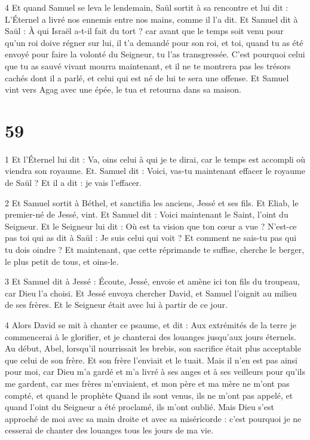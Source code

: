 \par 4 Et quand Samuel se leva le lendemain, Saül sortit à sa rencontre et lui dit : L'Éternel a livré nos ennemis entre nos mains, comme il l'a dit. Et Samuel dit à Saül : À qui Israël a-t-il fait du tort ? car avant que le temps soit venu pour qu'un roi doive régner sur lui, il t'a demandé pour son roi, et toi, quand tu as été envoyé pour faire la volonté du Seigneur, tu l'as transgressée. C'est pourquoi celui que tu as sauvé vivant mourra maintenant, et il ne te montrera pas les trésors cachés dont il a parlé, et celui qui est né de lui te sera une offense. Et Samuel vint vers Agag avec une épée, le tua et retourna dans sa maison.

\chapter{59}

\par 1 Et l'Éternel lui dit : Va, oins celui à qui je te dirai, car le temps est accompli où viendra son royaume. Et. Samuel dit : Voici, vas-tu maintenant effacer le royaume de Saül ? Et il a dit : je vais l’effacer.

\par 2 Et Samuel sortit à Béthel, et sanctifia les anciens, Jessé et ses fils. Et Eliab, le premier-né de Jessé, vint. Et Samuel dit : Voici maintenant le Saint, l'oint du Seigneur. Et le Seigneur lui dit : Où est ta vision que ton cœur a vue ? N'est-ce pas toi qui as dit à Saül : Je suis celui qui voit ? Et comment ne sais-tu pas qui tu dois oindre ? Et maintenant, que cette réprimande te suffise, cherche le berger, le plus petit de tous, et oins-le.

\par 3 Et Samuel dit à Jessé : Écoute, Jessé, envoie et amène ici ton fils du troupeau, car Dieu l'a choisi. Et Jessé envoya chercher David, et Samuel l'oignit au milieu de ses frères. Et le Seigneur était avec lui à partir de ce jour.

\par 4 Alors David se mit à chanter ce psaume, et dit : Aux extrémités de la terre je commencerai à le glorifier, et je chanterai des louanges jusqu'aux jours éternels. Au début, Abel, lorsqu'il nourrissait les brebis, son sacrifice était plus acceptable que celui de son frère. Et son frère l'enviait et le tuait. Mais il n'en est pas ainsi pour moi, car Dieu m'a gardé et m'a livré à ses anges et à ses veilleurs pour qu'ils me gardent, car mes frères m'enviaient, et mon père et ma mère ne m'ont pas compté, et quand le prophète Quand ils sont venus, ils ne m'ont pas appelé, et quand l'oint du Seigneur a été proclamé, ils m'ont oublié. Mais Dieu s'est approché de moi avec sa main droite et avec sa miséricorde : c'est pourquoi je ne cesserai de chanter des louanges tous les jours de ma vie.

